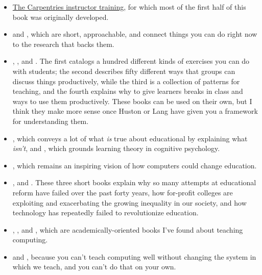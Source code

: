 \begin{itemize}

  \item \href{http://carpentries.github.io/instructor-training/}{The
    Carpentries instructor training}, for which most of the first half
    of this book was originally developed.

  \item \cite{Lang2016} and \cite{Hust2012}, which are short,
    approachable, and connect things you can do right now to the
    research that backs them.

  \item \cite{Majo2015}, \cite{Broo2016} \cite{Berg2012}, and
    \cite{Rice2018}.  The first catalogs a hundred different kinds of
    exercises you can do with students; the second describes fifty
    different ways that groups can discuss things productively, while
    the third is a collection of patterns for teaching, and the fourth
    explains why to give learners breaks in class and ways to use them
    productively.  These books can be used on their own, but I think
    they make more sense once Huston or Lang have given you a
    framework for understanding them.

  \item \cite{DeBr2015}, which conveys a lot of what \emph{is} true
    about educational by explaining what \emph{isn't}, and
    \cite{Dida2016}, which grounds learning theory in cognitive
    psychology.

  \item \cite{Pape1993}, which remains an inspiring vision of how
    computers could change education.

  \item \cite{Gree2014}, \cite{McMi2017} and \cite{Watt2014}.  These
    three short books explain why so many attempts at educational
    reform have failed over the past forty years, how for-profit
    colleges are exploiting and exacerbating the growing inequality in
    our society, and how technology has repeatedly failed to
    revolutionize education.

  \item \cite{Guzd2015a}, \cite{Hazz2014}, and \cite{Sent2018}, which
    are academically-oriented books I've found about teaching
    computing.

  \item \cite{Brow2007} and \cite{Mann2015}, because you can't teach
    computing well without changing the system in which we teach, and
    you can't do that on your own.

\end{itemize}

